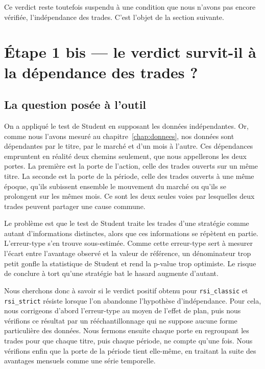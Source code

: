 Ce verdict reste toutefois suspendu à une condition que nous n'avons pas
encore vérifiée, l'indépendance des trades. C'est l'objet de la section
suivante.

\section{Étape 1 bis --- le verdict survit-il à la dépendance des trades ?}
\label{sec:b1-dependance}

\subsection{La question posée à l'outil}

On a appliqué le test de Student en supposant les données indépendantes.
Or, comme nous l'avons mesuré au chapitre~\ref{chap:donnees}, nos
données sont dépendantes par le titre, par le marché et d'un mois à
l'autre. Ces dépendances empruntent en réalité deux chemins seulement,
que nous appellerons les deux portes. La première est la porte de
l'action, celle des trades ouverts sur un même titre. La seconde est la
porte de la période, celle des trades ouverts à une même époque, qu'ils
subissent ensemble le mouvement du marché ou qu'ils se prolongent sur
les mêmes mois. Ce sont les deux seules voies par lesquelles deux trades
peuvent partager une cause commune.

Le problème est que le test de Student traite les trades d'une stratégie
comme autant d'informations distinctes, alors que ces informations se
répètent en partie. L'erreur-type s'en trouve sous-estimée. Comme cette
erreur-type sert à mesurer l'écart entre l'avantage observé et la valeur
de référence, un dénominateur trop petit gonfle la statistique de
Student et rend la p-value trop optimiste. Le risque de conclure à tort
qu'une stratégie bat le hasard augmente d'autant.

Nous cherchons donc à savoir si le verdict positif obtenu pour
\texttt{rsi\_classic} et \texttt{rsi\_strict} résiste lorsque l'on
abandonne l'hypothèse d'indépendance. Pour cela, nous corrigeons d'abord
l'erreur-type au moyen de l'effet de plan, puis nous vérifions ce
résultat par un rééchantillonnage qui ne suppose aucune forme
particulière des données. Nous fermons ensuite chaque porte en
regroupant les trades pour que chaque titre, puis chaque période, ne
compte qu'une fois. Nous vérifions enfin que la porte de la période
tient elle-même, en traitant la suite des avantages mensuels comme une
série temporelle.

